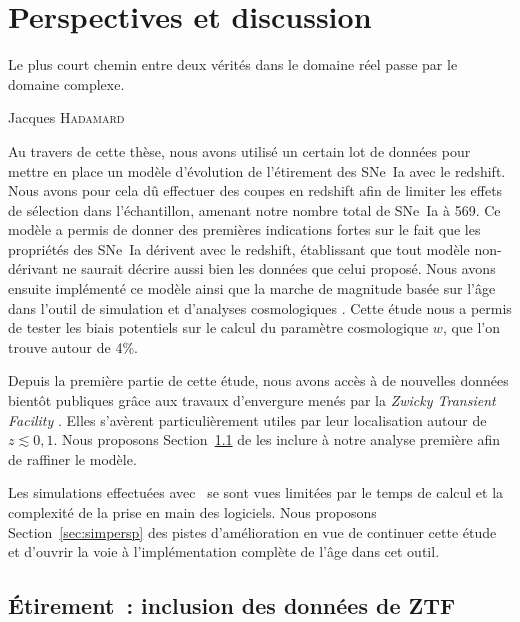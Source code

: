 \documentclass[../main/main.tex]{subfiles}
\begin{document}

\chapter{Perspectives et discussion}\label{ch:persp}
\epigraph{\openquote Le plus court chemin entre deux vérités dans le domaine
    réel passe par le domaine complexe.\closequote}{Jacques \textsc{Hadamard}}

Au travers de cette thèse, nous avons utilisé un certain lot de données pour
mettre en place un modèle d'évolution de l'étirement des SNe~Ia avec le
redshift. Nous avons pour cela dû effectuer des coupes en redshift afin de
limiter les effets de sélection dans l'échantillon, amenant notre nombre total
de SNe~Ia à 569. Ce modèle a permis de donner des premières indications fortes
sur le fait que les propriétés des SNe~Ia dérivent avec le redshift, établissant
que tout modèle non-dérivant ne saurait décrire aussi bien les données que celui
proposé. Nous avons ensuite implémenté ce modèle ainsi que la marche de
magnitude basée sur l'âge dans l'outil de simulation et d'analyses cosmologiques
\snana. Cette étude nous a permis de tester les biais potentiels sur le calcul
du paramètre cosmologique $w$, que l'on trouve autour de 4\%.

Depuis la première partie de cette étude, nous avons accès à de nouvelles
données bientôt publiques grâce aux travaux d'envergure menés par la
\textit{Zwicky Transient Facility} \citep[ZTF,][]{bellm2019}. Elles s'avèrent
particulièrement utiles par leur localisation autour de $z \lesssim 0,1$. Nous
proposons Section~\ref{sec:xztf} de les inclure à notre analyse première afin de
raffiner le modèle.

Les simulations effectuées avec \snana\ se sont vues limitées par le temps de
calcul et la complexité de la prise en main des logiciels. Nous proposons
Section~\ref{sec:simpersp} des pistes d'amélioration en vue de continuer cette
étude et d'ouvrir la voie à l'implémentation complète de l'âge dans cet outil.

\vspace*{\fill}
\minitoc
\vspace*{\fill}

\newpage

\section{Étirement~: inclusion des données de ZTF}\label{sec:xztf}
\end{document}
